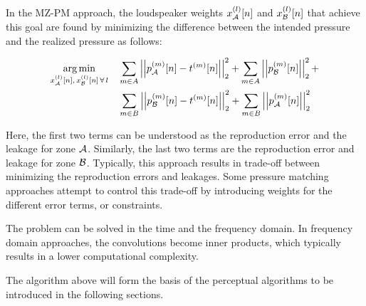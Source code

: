 In the MZ-PM approach, the loudspeaker weights $x_{\mathcal{A}}^{(l)}[n]$ and $x_{\mathcal{B}}^{(l)}[n]$ that achieve this goal are found by 
minimizing the difference between the intended pressure and the realized pressure as follows:

\begin{align}
    \argmin{x_\za^{(l)}[n],\,x_\zb^{(l)}[n]\,\forall\,l}{
       &\sum_{m\in A} \norm[2][2]{p_\za^{(m)}[n] - t^{(m)}[n]} +
        \sum_{m\in A} \norm[2][2]{p_\zb^{(m)}[n]} + \\
       &\sum_{m\in B} \norm[2][2]{p_\zb^{(m)}[n] - t^{(m)}[n]} + 
        \sum_{m\in B} \norm[2][2]{p_\za^{(m)}[n]}
    }
\end{align}

Here, the first two terms can be understood as the reproduction error and the leakage for zone $\mathcal{A}$.
Similarly, the last two terms are the reproduction error and leakage for zone $\mathcal{B}$. 
Typically, this approach results in trade-off between minimizing the reproduction errors and leakages. 
Some pressure matching approaches attempt to control this trade-off by introducing weights for the different error terms, or constraints.

The problem can be solved in the time and the frequency domain.
In frequency domain approaches, the convolutions become inner products, which typically results in a lower computational complexity.

The algorithm above will form the basis of the perceptual algorithms to be introduced in the following sections.
